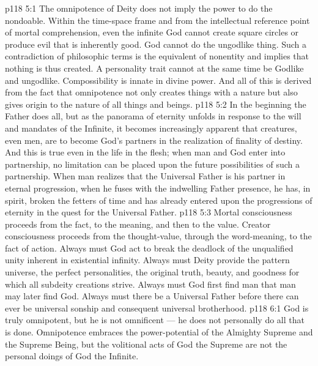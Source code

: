 \vs p118 5:1 The omnipotence of Deity does not imply the power to do the nondoable. Within the time\hyp{}space frame and from the intellectual reference point of mortal comprehension, even the infinite God cannot create square circles or produce evil that is inherently good. God cannot do the ungodlike thing. Such a contradiction of philosophic terms is the equivalent of nonentity and implies that nothing is thus created. A personality trait cannot at the same time be Godlike and ungodlike. Compossibility is innate in divine power. And all of this is derived from the fact that omnipotence not only creates things with a nature but also gives origin to the nature of all things and beings.
\vs p118 5:2 \pc In the beginning the Father does all, but as the panorama of eternity unfolds in response to the will and mandates of the Infinite, it becomes increasingly apparent that creatures, even men, are to become God’s partners in the realization of finality of destiny. And this is true even in the life in the flesh; when man and God enter into partnership, no limitation can be placed upon the future possibilities of such a partnership. When man realizes that the Universal Father is his partner in eternal progression, when he fuses with the indwelling Father presence, he has, in spirit, broken the fetters of time and has already entered upon the progressions of eternity in the quest for the Universal Father.
\vs p118 5:3 Mortal consciousness proceeds from the fact, to the meaning, and then to the value. Creator consciousness proceeds from the thought\hyp{}value, through the word\hyp{}meaning, to the fact of action. Always must God act to break the deadlock of the unqualified unity inherent in existential infinity. Always must Deity provide the pattern universe, the perfect personalities, the original truth, beauty, and goodness for which all subdeity creations strive. Always must God first find man that man may later find God. Always must there be a Universal Father before there can ever be universal sonship and consequent universal brotherhood.
\vs p118 6:1 God is truly omnipotent, but he is not omnificent --- he does not personally do all that is done. Omnipotence embraces the power\hyp{}potential of the Almighty Supreme and the Supreme Being, but the volitional acts of God the Supreme are not the personal doings of God the Infinite.
